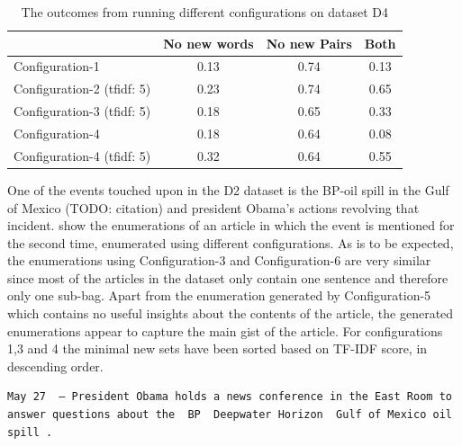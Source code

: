 \begin{center}
\begin{table}
  \begin{tabular}{|l|c|c|c|}
    \hline
    &  No new words & No new Pairs & Both \\ \hline
    Configuration-1                    & 0.13  & 0.74  & 0.13 \\ \hline
    Configuration-2 (tfidf: 5)         & 0.23  & 0.74  & 0.65 \\ \hline
    Configuration-3 (tfidf: 5)         & 0.18  & 0.65  & 0.33 \\ \hline
    Configuration-4                    & 0.18  & 0.64  & 0.08 \\ \hline
    Configuration-4 (tfidf: 5)         & 0.32  & 0.64  & 0.55 \\ \hline
  \end{tabular}
  \caption{The outcomes from running different configurations on dataset D4}
  \label{tab:d4}
\end{table}
\end{center}

One of the events touched upon in the D2 dataset is the BP-oil spill in the Gulf of Mexico (TODO: citation) and president Obama's actions revolving that incident.  show the enumerations of an article in which the event is mentioned for the second time, enumerated using different configurations. As is to be expected, the enumerations using Configuration-3 and Configuration-6 are very similar since most of the articles in the dataset only contain one sentence and therefore only one sub-bag. Apart from the enumeration generated by Configuration-5 which contains no useful insights about the contents of the article, the generated enumerations appear to capture the main gist of the article. For configurations 1,3 and 4 the minimal new sets have been sorted based on TF-IDF score, in descending order.

\begin{lstlisting}[caption=Original text,
    label={lst:original},
  ]
  May 27  – President Obama holds a news conference in the East Room to answer questions about the  BP  Deepwater Horizon  Gulf of Mexico oil spill . 
\end{lstlisting}

